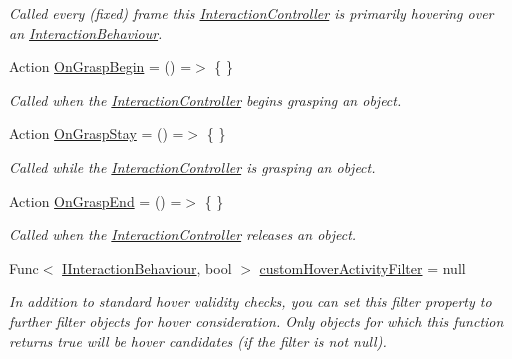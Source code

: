 \begin{DoxyCompactItemize}
\begin{DoxyCompactList}\small\item\em Called every (fixed) frame this \mbox{\hyperlink{class_leap_1_1_unity_1_1_interaction_1_1_interaction_controller}{Interaction\+Controller}} is primarily hovering over an \mbox{\hyperlink{class_leap_1_1_unity_1_1_interaction_1_1_interaction_behaviour}{Interaction\+Behaviour}}. \end{DoxyCompactList}\item 
Action \mbox{\hyperlink{class_leap_1_1_unity_1_1_interaction_1_1_interaction_controller_ac6f8d116e41ed7b2dadd1dcad335a3a2}{On\+Grasp\+Begin}} = () =$>$ \{ \}
\begin{DoxyCompactList}\small\item\em Called when the \mbox{\hyperlink{class_leap_1_1_unity_1_1_interaction_1_1_interaction_controller}{Interaction\+Controller}} begins grasping an object. \end{DoxyCompactList}\item 
Action \mbox{\hyperlink{class_leap_1_1_unity_1_1_interaction_1_1_interaction_controller_aecda4487fc96ce08c3159d1b4cc92c52}{On\+Grasp\+Stay}} = () =$>$ \{ \}
\begin{DoxyCompactList}\small\item\em Called while the \mbox{\hyperlink{class_leap_1_1_unity_1_1_interaction_1_1_interaction_controller}{Interaction\+Controller}} is grasping an object. \end{DoxyCompactList}\item 
Action \mbox{\hyperlink{class_leap_1_1_unity_1_1_interaction_1_1_interaction_controller_a1ff810c665a33a222e7d736ac224d839}{On\+Grasp\+End}} = () =$>$ \{ \}
\begin{DoxyCompactList}\small\item\em Called when the \mbox{\hyperlink{class_leap_1_1_unity_1_1_interaction_1_1_interaction_controller}{Interaction\+Controller}} releases an object. \end{DoxyCompactList}\item 
Func$<$ \mbox{\hyperlink{interface_leap_1_1_unity_1_1_interaction_1_1_i_interaction_behaviour}{I\+Interaction\+Behaviour}}, bool $>$ \mbox{\hyperlink{class_leap_1_1_unity_1_1_interaction_1_1_interaction_controller_a877fe13bf17b656525d7bf63e3baa8d8}{custom\+Hover\+Activity\+Filter}} = null
\begin{DoxyCompactList}\small\item\em In addition to standard hover validity checks, you can set this filter property to further filter objects for hover consideration. Only objects for which this function returns true will be hover candidates (if the filter is not null). \end{DoxyCompactList}\end{DoxyCompactItemize}
